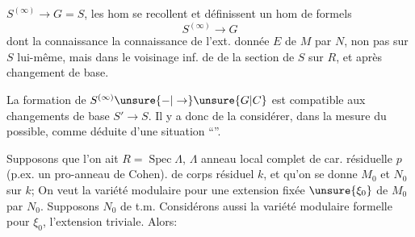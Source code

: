 $S^{(\infty)}\longrightarrow G=\widehat S$, les hom
 se recollent et définissent
un hom de  formels
\[
S^{(\infty)}\longrightarrow G
\]
dont la connaissance  
la connaissance de l'ext. donnée $E$ de $M$ par $N$, non pas
sur $S$ lui-même, mais dans le voisinage inf. de
 de la section de $S$ sur $R$, et
 après changement de base.


La formation de $S^{(\infty)}\unsure{-|\to}\unsure{G|C}$
est compatible aux changements de base 
$S'\longrightarrow S$. Il y a 
donc de la considérer, dans la mesure du possible, comme déduite
d'une situation ``''.

Supposons   que l'on
ait  $R=\operatorname{Spec}\Lambda$,
$\Lambda$ anneau local  complet de car.
résiduelle $p$ (p.ex. un pro-anneau de Cohen).
de corps résiduel $k$, et qu'on se donne $M_0$ et $N_0$
sur $k$; On veut la variété modulaire
pour une extension fixée $\unsure{\xi_0}$ de $M_0$ par $N_0$.
Supposons $N_0$ de t.m.
Considérons aussi la variété modulaire formelle pour $\xi_0$,
l'extension triviale.  Alors:

